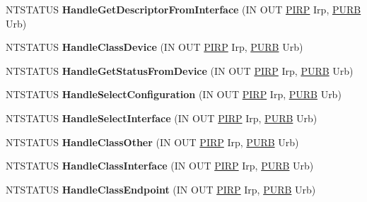 \begin{DoxyCompactItemize}
N\+T\+S\+T\+A\+T\+US {\bfseries Handle\+Get\+Descriptor\+From\+Interface} (IN O\+UT \hyperlink{interfacevoid}{P\+I\+RP} Irp, \hyperlink{struct___u_r_b}{P\+U\+RB} Urb)
\item 
\mbox{\label{class_c_hub_controller_ab77fe04a9f4dd4a6dbc5eea04cd7c1aa}} 
N\+T\+S\+T\+A\+T\+US {\bfseries Handle\+Class\+Device} (IN O\+UT \hyperlink{interfacevoid}{P\+I\+RP} Irp, \hyperlink{struct___u_r_b}{P\+U\+RB} Urb)
\item 
\mbox{\label{class_c_hub_controller_a01d65855605049b5d407db1c8523acfc}} 
N\+T\+S\+T\+A\+T\+US {\bfseries Handle\+Get\+Status\+From\+Device} (IN O\+UT \hyperlink{interfacevoid}{P\+I\+RP} Irp, \hyperlink{struct___u_r_b}{P\+U\+RB} Urb)
\item 
\mbox{\label{class_c_hub_controller_a45e5c11e08481f7da71453bee5baf9a4}} 
N\+T\+S\+T\+A\+T\+US {\bfseries Handle\+Select\+Configuration} (IN O\+UT \hyperlink{interfacevoid}{P\+I\+RP} Irp, \hyperlink{struct___u_r_b}{P\+U\+RB} Urb)
\item 
\mbox{\label{class_c_hub_controller_a3f293184b3f9082e679bf7ae333089e4}} 
N\+T\+S\+T\+A\+T\+US {\bfseries Handle\+Select\+Interface} (IN O\+UT \hyperlink{interfacevoid}{P\+I\+RP} Irp, \hyperlink{struct___u_r_b}{P\+U\+RB} Urb)
\item 
\mbox{\label{class_c_hub_controller_a9c64c536d2fa09cd63f814e8c30ff42b}} 
N\+T\+S\+T\+A\+T\+US {\bfseries Handle\+Class\+Other} (IN O\+UT \hyperlink{interfacevoid}{P\+I\+RP} Irp, \hyperlink{struct___u_r_b}{P\+U\+RB} Urb)
\item 
\mbox{\label{class_c_hub_controller_a0f6848aca0ded564193ac35e437dbf82}} 
N\+T\+S\+T\+A\+T\+US {\bfseries Handle\+Class\+Interface} (IN O\+UT \hyperlink{interfacevoid}{P\+I\+RP} Irp, \hyperlink{struct___u_r_b}{P\+U\+RB} Urb)
\item 
\mbox{\label{class_c_hub_controller_a5d668e45920b13bcd749873dce029b12}} 
N\+T\+S\+T\+A\+T\+US {\bfseries Handle\+Class\+Endpoint} (IN O\+UT \hyperlink{interfacevoid}{P\+I\+RP} Irp, \hyperlink{struct___u_r_b}{P\+U\+RB} Urb)
\item 

\end{DoxyCompactItemize}
